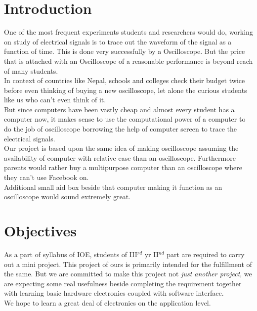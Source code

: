 \documentclass[11pt,a4paper]{article}
\begin{document}
\newpage


\section{Introduction}
One of the most frequent experiments students and researchers would do, working on study of electrical signals is to trace out the waveform of the signal as a function of time. This is done very successfully by a Oscilloscope. But the price that is attached with an Oscilloscope of a reasonable performance is beyond reach of many students. \\

In context of countries like Nepal, schools and colleges check their budget twice before even thinking of buying a new oscilloscope, let alone the curious students like us who can't even think of it.\\

But since computers have been vastly cheap and almost every student has a computer now, it makes sense to use the computational power of a computer to do the job of oscilloscope borrowing the help of computer screen to trace the electrical signals.\\

Our project is based upon the same idea of making oscilloscope assuming the availability of computer with relative ease than an oscilloscope. Furthermore parents would rather buy a multipurpose computer than an oscilloscope where they can't use Facebook on.\\

Additional small aid box beside that computer making it function as an oscilloscope would sound extremely great.\\

\section{Objectives}
As a part of syllabus of IOE, students of III${}^{rd}$ yr II${}^{nd}$ part are required to carry out a mini project. This project of ours is primarily intended for the fulfillment of the same. But we are committed to make this project not \emph{just another project}, we are expecting some real usefulness beside completing the requirement together with learning basic hardware electronics coupled with software interface.\\

We hope to learn a great deal of electronics on the application level.\\
\end{document}
